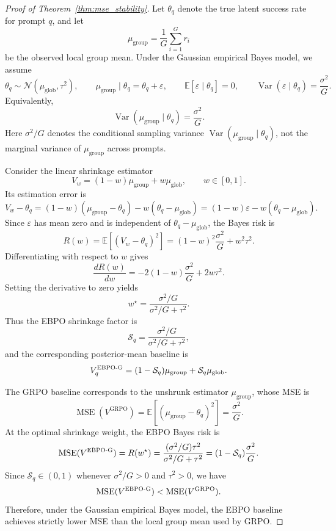 \documentclass{article}
\theoremstyle{plain}
\theoremstyle{definition}
\theoremstyle{remark}
\newcommand{\oursG}{\textsc{EBPO-G}\xspace}
\begin{document}
\begin{proof}[Proof of Theorem~\ref{thm:mse_stability}]
Let $\theta_q$ denote the true latent success rate for prompt $q$, and let
\[
    \mu_{\mathrm{group}}
    =
    \frac{1}{G}\sum_{i=1}^{G} r_i
\]
be the observed local group mean. Under the Gaussian empirical Bayes model, we assume
\[
    \theta_q \sim \mathcal N(\mu_{\mathrm{glob}},\tau^2),
    \qquad
    \mu_{\mathrm{group}}\mid \theta_q
    =
    \theta_q+\varepsilon,
    \qquad
    \mathbb E[\varepsilon\mid \theta_q]=0,
    \qquad
    \operatorname{Var}(\varepsilon\mid \theta_q)=\frac{\sigma^2}{G}.
\]
Equivalently,
\[
    \operatorname{Var}(\mu_{\mathrm{group}}\mid \theta_q)
    =
    \frac{\sigma^2}{G}.
\]
Here $\sigma^2/G$ denotes the conditional sampling variance
$\operatorname{Var}(\mu_{\mathrm{group}}\mid \theta_q)$, not the marginal variance of
$\mu_{\mathrm{group}}$ across prompts.

Consider the linear shrinkage estimator
\[
    V_w
    =
    (1-w)\mu_{\mathrm{group}}+w\mu_{\mathrm{glob}},
    \qquad
    w\in[0,1].
\]
Its estimation error is
\[
    V_w-\theta_q
    =
    (1-w)(\mu_{\mathrm{group}}-\theta_q)
    -
    w(\theta_q-\mu_{\mathrm{glob}})
    =
    (1-w)\varepsilon
    -
    w(\theta_q-\mu_{\mathrm{glob}}).
\]
Since $\varepsilon$ has mean zero and is independent of $\theta_q-\mu_{\mathrm{glob}}$, the Bayes risk is
\[
    R(w)
    =
    \mathbb E[(V_w-\theta_q)^2]
    =
    (1-w)^2\frac{\sigma^2}{G}
    +
    w^2\tau^2.
\]
Differentiating with respect to $w$ gives
\[
    \frac{dR(w)}{dw}
    =
    -2(1-w)\frac{\sigma^2}{G}
    +
    2w\tau^2.
\]
Setting the derivative to zero yields
\[
    w^\star
    =
    \frac{\sigma^2/G}{\sigma^2/G+\tau^2}.
\]
Thus the EBPO shrinkage factor is
\[
    \mathcal S_q
    =
    \frac{\sigma^2/G}{\sigma^2/G+\tau^2},
\]
and the corresponding posterior-mean baseline is
\[
    V_q^{\oursG}
    =
    (1-\mathcal S_q)\mu_{\mathrm{group}}
    +
    \mathcal S_q\mu_{\mathrm{glob}}.
\]

The GRPO baseline corresponds to the unshrunk estimator $\mu_{\mathrm{group}}$, whose MSE is
\[
    \operatorname{MSE}(V^{\mathrm{GRPO}})
    =
    \mathbb E[(\mu_{\mathrm{group}}-\theta_q)^2]
    =
    \frac{\sigma^2}{G}.
\]
At the optimal shrinkage weight, the EBPO Bayes risk is
\[
    \operatorname{MSE}(V^{\oursG})
    =
    R(w^\star)
    =
    \frac{(\sigma^2/G)\tau^2}{\sigma^2/G+\tau^2}
    =
    (1-\mathcal S_q)\frac{\sigma^2}{G}.
\]
Since $\mathcal S_q\in(0,1)$ whenever $\sigma^2/G>0$ and $\tau^2>0$, we have
\[
    \operatorname{MSE}(V^{\oursG})
    <
    \operatorname{MSE}(V^{\mathrm{GRPO}}).
\]
Therefore, under the Gaussian empirical Bayes model, the EBPO baseline achieves strictly lower MSE
than the local group mean used by GRPO.
\end{proof}
\end{document}
